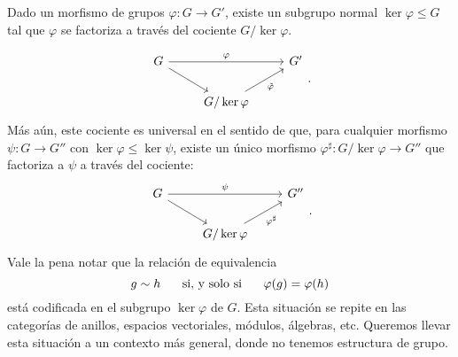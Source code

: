\documentclass[12pt,letterpaper,titlepage]{article}
\theoremstyle{definition}
\renewcommand\phi{\varphi}
\newcommand\ssi{\hspace{5mm}\text{ si, y solo si }\hspace{5mm}}
\newcommand\<{\langle}
\renewcommand\>{\rangle}
\begin{document}
Dado un morfismo de grupos $\phi:G\to G'$, existe un subgrupo normal
$\ker \phi\leq G$ tal que $\phi$ se factoriza a través del cociente
$G/\ker \phi$.

\[
    \begin{tikzcd}
        G \ar[dr] \ar[rr,"\phi"] && G' \\
        &G/\ker \phi \ar[ur,"\tilde\phi"']
    \end{tikzcd}
.\]
Más aún, este cociente es universal en el sentido de que, para cualquier 
morfismo $\psi:G\to G''$ con $\ker\phi \leq \ker\psi$, existe un único
morfismo $\phi^\sharp:G/\ker\phi\to G''$ que factoriza a $\psi$ a través
del cociente:
\[
    \begin{tikzcd}
        G \ar[dr] \ar[rr,"\psi"] && G'' \\
        &G/\ker \phi \ar[ur,"\phi^\sharp"']
    \end{tikzcd}
.\]
Vale la pena notar que la relación de equivalencia
\[
    g\sim h \ssi \phi(g) = \phi(h)
\]
está codificada en el subgrupo $\ker \phi$ de $G$.
Esta situación se repite en las categorías de anillos,
espacios vectoriales, módulos, álgebras, etc.
Queremos llevar esta situación a un contexto más general, donde no tenemos
estructura de grupo.
\end{document}
